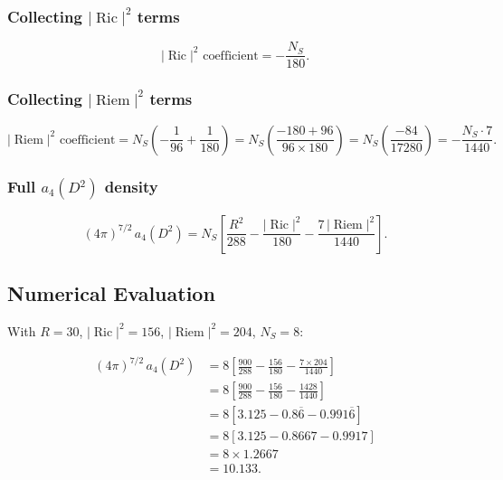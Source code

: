 \documentclass[12pt,a4paper]{article}
\theoremstyle{definition}
\DeclareMathOperator{\Ric}{Ric}
\DeclareMathOperator{\Riem}{Riem}
\begin{document}
\subsubsection{Collecting $|\Ric|^2$ terms}

\begin{equation}
|\Ric|^2\text{ coefficient} = -\frac{N_S}{180}.
\end{equation}

\subsubsection{Collecting $|\Riem|^2$ terms}

\begin{equation}
|\Riem|^2\text{ coefficient} = N_S\left(-\frac{1}{96}
+ \frac{1}{180}\right)
= N_S\left(\frac{-180 + 96}{96 \times 180}\right)
= N_S\left(\frac{-84}{17280}\right)
= -\frac{N_S \cdot 7}{1440}.
\end{equation}

\subsubsection{Full $a_4(D^2)$ density}

\begin{equation}\label{eq:a4-D2-density}
\boxed{(4\pi)^{7/2}\,a_4(D^2) = N_S\left[
\frac{R^2}{288} - \frac{|\Ric|^2}{180}
- \frac{7\,|\Riem|^2}{1440}\right].}
\end{equation}


\subsection{Numerical Evaluation}

With $R = 30$, $|\Ric|^2 = 156$, $|\Riem|^2 = 204$, $N_S = 8$:

\begin{align}
(4\pi)^{7/2}\,a_4(D^2) &= 8\left[
\frac{900}{288} - \frac{156}{180} - \frac{7 \times 204}{1440}
\right] \nonumber\\
&= 8\left[\frac{900}{288} - \frac{156}{180} - \frac{1428}{1440}
\right] \nonumber\\
&= 8\left[3.125 - 0.8\overline{6} - 0.991\overline{6}\right]
\nonumber\\
&= 8\left[3.125 - 0.8667 - 0.9917\right] \nonumber\\
&= 8 \times 1.2667 \nonumber\\
&= 10.133.
\end{align}
\end{document}
